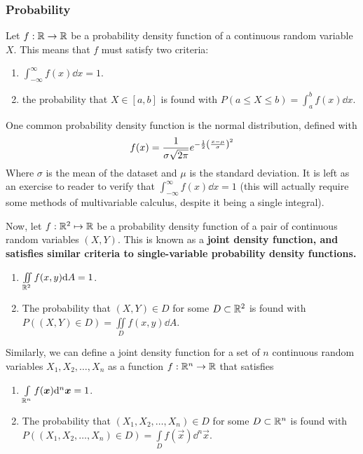 \subsubsection{Probability}
Let $f: \mathbb{R}\to\mathbb{R}$ be a probability density function of a continuous random variable $X$. This means that $f$ must satisfy two criteria:
\begin{enumerate}
    \item \(\int_{-\infty}^\infty f(x)\dd x = 1\).
    \item the probability that \(X\in[a,b]\) is found with \(P(a\leq X\leq b) = \int_a^bf(x)\dd x\).
\end{enumerate}
One common probability density function is the normal distribution, defined with
\[ f(x) = \frac{1}{\sigma\sqrt{2\pi}}e^{-\frac{1}{2}\pqty{\frac{x-\mu}{\sigma}}^2}\]
Where \(\sigma\) is the mean of the dataset and \( \mu\) is the standard deviation. It is left as an exercise to reader to verify that \( \int_{-\infty}^\infty f(x)\dd x = 1\) (this will actually require some methods of multivariable calculus, despite it being a single integral). \par
Now, let $f: \mathbb{R}^2\mapsto \mathbb{R}$ be a probability density function of a pair of continuous random variables \((X,Y)\). This is known as a \bf{joint density function}, and satisfies similar criteria to single-variable probability density functions.
\begin{enumerate}
    \item \(\iint\limits_{\mathbb{R}^2} f(x,y)\dd A = 1\).
    \item The probability that \((X,Y)\in D\) for some \(D\subset \mathbb{R}^2\) is found with \(P((X,Y)\in D) = \iint\limits_D f(x,y)\dd A\).
\end{enumerate}
Similarly, we can define a joint density function for a set of $n$ continuous random variables \( X_1, X_2, \dots, X_n \) as a function \(f: \mathbb{R}^n\to\mathbb{R}\) that satisfies 
\begin{enumerate}
    \item \(\int\limits_{\mathbb{R}^n} f(\boldsymbol{x})\dd^n\boldsymbol{x} = 1\).
    \item The probability that \((X_1, X_2, \dots, X_n)\in D\) for some \(D\subset \mathbb{R}^n\) is found with \(P((X_1, X_2, \dots, X_n)\in D) = \int\limits_D f(\vec x)\dd^n\vec x\).
\end{enumerate}
